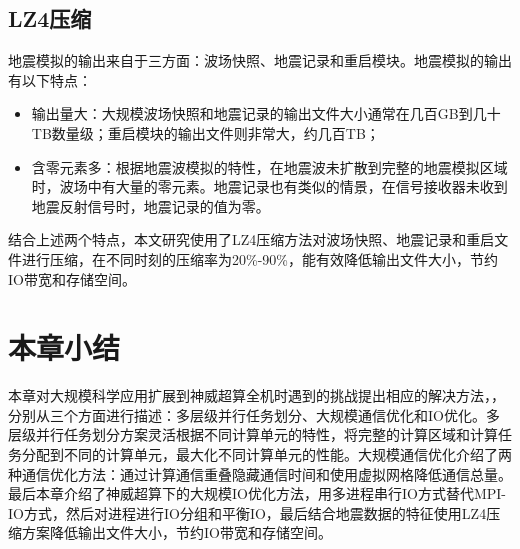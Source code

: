 \subsection{LZ4压缩}

地震模拟的输出来自于三方面：波场快照、地震记录和重启模块。地震模拟的输出有以下特点：
\begin{itemize}
  \item 输出量大：大规模波场快照和地震记录的输出文件大小通常在几百GB到几十TB数量级；重启模块的输出文件则非常大，约几百TB；
  \item 含零元素多：根据地震波模拟的特性，在地震波未扩散到完整的地震模拟区域时，波场中有大量的零元素。地震记录也有类似的情景，在信号接收器未收到地震反射信号时，地震记录的值为零。
\end{itemize}

结合上述两个特点，本文研究使用了LZ4压缩方法对波场快照、地震记录和重启文件进行压缩，在不同时刻的压缩率为20\%-90\%，能有效降低输出文件大小，节约IO带宽和存储空间。

\section{本章小结}

本章对大规模科学应用扩展到神威超算全机时遇到的挑战提出相应的解决方法，，分别从三个方面进行描述：多层级并行任务划分、大规模通信优化和IO优化。多层级并行任务划分方案灵活根据不同计算单元的特性，将完整的计算区域和计算任务分配到不同的计算单元，最大化不同计算单元的性能。大规模通信优化介绍了两种通信优化方法：通过计算通信重叠隐藏通信时间和使用虚拟网格降低通信总量。最后本章介绍了神威超算下的大规模IO优化方法，用多进程串行IO方式替代MPI-IO方式，然后对进程进行IO分组和平衡IO，最后结合地震数据的特征使用LZ4压缩方案降低输出文件大小，节约IO带宽和存储空间。

